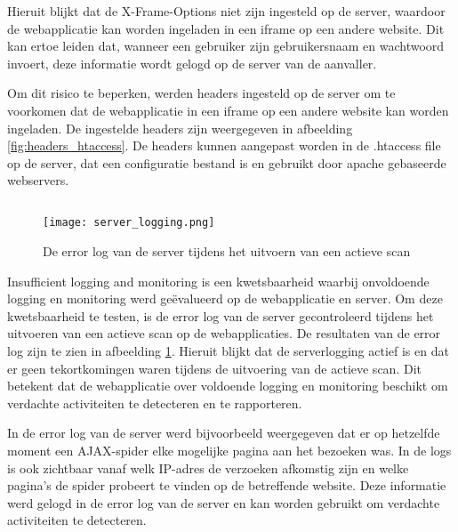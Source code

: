 Hieruit blijkt dat de X-Frame-Options niet zijn ingesteld op de server, waardoor de webapplicatie kan worden ingeladen in een 
iframe op een andere website. Dit kan ertoe leiden dat, wanneer een gebruiker zijn gebruikersnaam en wachtwoord
invoert, deze informatie wordt gelogd op de server van de aanvaller.

Om dit risico te beperken, werden headers ingesteld op de server om te voorkomen dat de webapplicatie in een iframe op een 
andere website kan worden ingeladen. De ingestelde headers zijn weergegeven in afbeelding \ref{fig:headers_htaccess}. De 
headers kunnen aangepast worden in de .htaccess file op de server, dat een configuratie bestand is en gebruikt door apache 
gebaseerde webservers.

\subsection{}
\begin{figure}
    \centering
    \texttt{[image: server\_logging.png]}
    \caption[De error log van de server tijdens het uitvoern van een actieve scan]{De error log van de server tijdens het uitvoern van een actieve scan}
    \label{fig:server_logging}
\end{figure}
Insufficient logging and monitoring is een kwetsbaarheid waarbij onvoldoende logging en monitoring werd geëvalueerd op de 
webapplicatie en server. Om deze kwetsbaarheid te testen, is de error log van de server gecontroleerd tijdens het uitvoeren van een 
actieve scan op de webapplicaties. De resultaten van de error log zijn te zien in afbeelding \ref{fig:server_logging}. 
Hieruit blijkt dat de serverlogging actief is en dat er geen tekortkomingen waren tijdens de uitvoering van de actieve scan. 
Dit betekent dat de webapplicatie over voldoende logging en monitoring beschikt om verdachte activiteiten te detecteren en te 
rapporteren.

In de error log van de server werd bijvoorbeeld weergegeven dat er op hetzelfde moment een AJAX-spider elke mogelijke pagina aan 
het bezoeken was. In de logs is ook zichtbaar vanaf welk IP-adres de verzoeken afkomstig zijn en welke pagina's de spider 
probeert te vinden op de betreffende website. Deze informatie werd gelogd in de error log van de server en kan worden 
gebruikt om verdachte activiteiten te detecteren.

